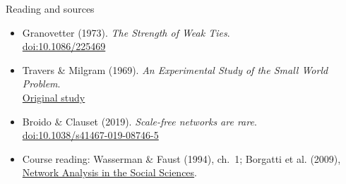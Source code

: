 \documentclass[aspectratio=169,11pt]{beamer}
\begin{document}
\begin{frame}{Reading and sources}
\small
\begin{itemize}
\item Granovetter (1973). \emph{The Strength of Weak Ties}.\\
\href{https://doi.org/10.1086/225469}{doi:10.1086/225469}
\medskip
\item Travers \& Milgram (1969). \emph{An Experimental Study of the Small World Problem}.\\
\href{https://snap.stanford.edu/class/cs224w-readings/travers69smallworld.pdf}{Original study}
\medskip
\item Broido \& Clauset (2019). \emph{Scale-free networks are rare}.\\
\href{https://doi.org/10.1038/s41467-019-08746-5}{doi:10.1038/s41467-019-08746-5}
\medskip
\item Course reading: Wasserman \& Faust (1994), ch.~1; Borgatti et al. (2009), \href{https://doi.org/10.1126/science.1165821}{Network Analysis in the Social Sciences}.
\end{itemize}
\end{frame}
\end{document}
